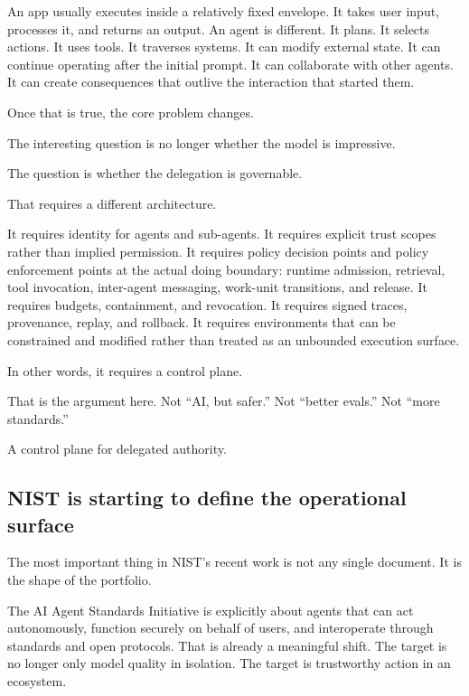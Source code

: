 \documentclass[11pt]{article}
\begin{document}
An app usually executes inside a relatively fixed envelope. It takes
user input, processes it, and returns an output. An agent is different.
It plans. It selects actions. It uses tools. It traverses systems. It
can modify external state. It can continue operating after the initial
prompt. It can collaborate with other agents. It can create consequences
that outlive the interaction that started them.

Once that is true, the core problem changes.

The interesting question is no longer whether the model is impressive.

The question is whether the delegation is governable.

That requires a different architecture.

It requires identity for agents and sub-agents. It requires explicit
trust scopes rather than implied permission. It requires policy decision
points and policy enforcement points at the actual doing boundary:
runtime admission, retrieval, tool invocation, inter-agent messaging,
work-unit transitions, and release. It requires budgets, containment,
and revocation. It requires signed traces, provenance, replay, and
rollback. It requires environments that can be constrained and modified
rather than treated as an unbounded execution surface.

In other words, it requires a control plane.

That is the argument here. Not ``AI, but safer.'' Not ``better evals.''
Not ``more standards.''

A control plane for delegated authority.

\hypertarget{nist-is-starting-to-define-the-operational-surface}{%
\subsection{NIST is starting to define the operational
surface}\label{nist-is-starting-to-define-the-operational-surface}}

The most important thing in NIST's recent work is not any single
document. It is the shape of the portfolio.

The AI Agent Standards Initiative is explicitly about agents that can
act autonomously, function securely on behalf of users, and interoperate
through standards and open protocols. That is already a meaningful
shift. The target is no longer only model quality in isolation. The
target is trustworthy action in an ecosystem.
\end{document}
